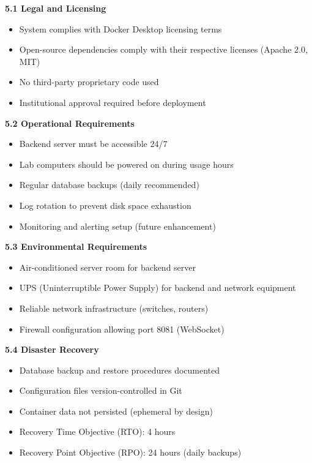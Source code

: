 \documentclass[12pt,a4paper]{article}
\begin{document}
\textbf{5.1 Legal and Licensing}

\begin{itemize}[noitemsep]
    \item System complies with Docker Desktop licensing terms
    \item Open-source dependencies comply with their respective licenses (Apache 2.0, MIT)
    \item No third-party proprietary code used
    \item Institutional approval required before deployment
\end{itemize}

\textbf{5.2 Operational Requirements}

\begin{itemize}[noitemsep]
    \item Backend server must be accessible 24/7
    \item Lab computers should be powered on during usage hours
    \item Regular database backups (daily recommended)
    \item Log rotation to prevent disk space exhaustion
    \item Monitoring and alerting setup (future enhancement)
\end{itemize}

\textbf{5.3 Environmental Requirements}

\begin{itemize}[noitemsep]
    \item Air-conditioned server room for backend server
    \item UPS (Uninterruptible Power Supply) for backend and network equipment
    \item Reliable network infrastructure (switches, routers)
    \item Firewall configuration allowing port 8081 (WebSocket)
\end{itemize}

\textbf{5.4 Disaster Recovery}

\begin{itemize}[noitemsep]
    \item Database backup and restore procedures documented
    \item Configuration files version-controlled in Git
    \item Container data not persisted (ephemeral by design)
    \item Recovery Time Objective (RTO): 4 hours
    \item Recovery Point Objective (RPO): 24 hours (daily backups)
\end{itemize}
\end{document}
